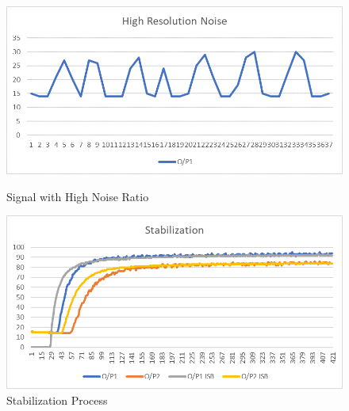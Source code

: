 		\begin{figure}
			\begin{center}
				\includegraphics[width=1\textwidth]{Pics/3}
				\caption{Signal with High Noise Ratio}
				\vspace{2cm}
				\includegraphics[width=1\textwidth]{Pics/4}
				\caption{Stabilization Process}
				\medskip
			\end{center}
		\end{figure}






